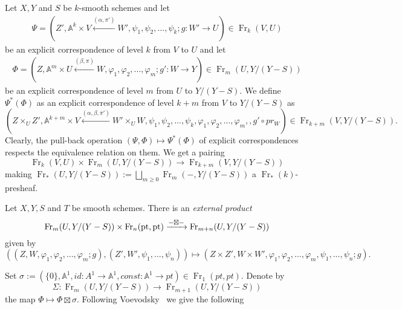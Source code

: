 \documentclass[a4paper,11pt,reqno]{amsart}
\begin{document}
Let $X,Y$ and $S$ be $k$-smooth schemes and let
\begin{gather*}
\Psi=(Z',{\mathbb{A}}^k\times V\xleftarrow{(\alpha,\pi')}
W',\psi_1,\psi_2,\dots,\psi_k;g:W'\to U)\in {\operatorname{Fr}}_k(V,U)
\end{gather*}
be an explicit correspondence of level $k$ from $V$ to $U$ and let
\begin{gather*}
\Phi=(Z,{\mathbb{A}}^m\times U\xleftarrow{(\beta,\pi)}
W,\varphi_1,\varphi_2,\dots,\varphi_m;g':W\to Y)\in {\operatorname{Fr}}_m(U,Y/(Y-S))
\end{gather*}
be an explicit correspondence of level $m$ from $U$ to $Y/(Y-S)$. We
define $\Psi^{*}(\Phi)$ as an explicit correspondence of level $k+m$
from $V$ to $Y/(Y-S)$ as
\[
(Z\times_U Z',{\mathbb{A}}^{k+m}\times V\xleftarrow{(\alpha,\beta,\pi')} W'\times_U W,\psi_1,\psi_2,\dots,\psi_k,\varphi_1,\varphi_2,\dots,\varphi_m,,g'\circ pr_W)\in
{\operatorname{Fr}}_{k+m}(V,Y/(Y-S)).
\]
Clearly, the pull-back operation $(\Psi,\Phi)\mapsto \Psi^{*}(\Phi)$
of explicit correspondences respects the equivalence relation on
them. We get a pairing
   \begin{equation}\label{eq:compos}
    {\operatorname{Fr}}_k(V,U)\times {\operatorname{Fr}}_m(U,Y/(Y-S))\to {\operatorname{Fr}}_{k+m}(V,Y/(Y-S))
   \end{equation}
making ${\operatorname{Fr}}_*(U,Y/(Y-S)):=\bigsqcup_{m{\geqslant} 0} {\operatorname{Fr}}_m(-,Y/(Y-S))$ a
${\operatorname{Fr}}_*(k)$-presheaf.

Let $X,Y,S$ and $T$ be smooth schemes. There is an \textit{external
product}
 \begin{equation}\label{eq:ext_product}
{\operatorname{Fr}}_m(U,Y/(Y-S))\times {\operatorname{Fr}}_n({{\rm pt}},{{\rm pt}}) \xrightarrow{-\boxtimes -}
{\operatorname{Fr}}_{m+n}(U,Y/(Y-S))
 \end{equation}
given by
$$((Z,W,\varphi_1,\varphi_2,\dots,\varphi_m;g),(Z',W',\psi_1,...,\psi_n))\mapsto
(Z\times Z',W\times
W',\varphi_1,\varphi_2,\dots,\varphi_m,\psi_1,...,\psi_n;g).$$

Set $\sigma:= (\{0\},{\mathbb{A}}^1,id : A^1 \to {\mathbb{A}}^1,const : {\mathbb{A}}^1 \to pt)\in {\operatorname{Fr}}_1(pt,pt)$.
Denote by
$$\Sigma: {\operatorname{Fr}}_m(U,Y/(Y-S))\to {\operatorname{Fr}}_{m+1}(U,Y/(Y-S))$$
the map $\Phi \mapsto \Phi\boxtimes \sigma$. Following
Voevodsky~\cite{V2} we give the following
\end{document}
